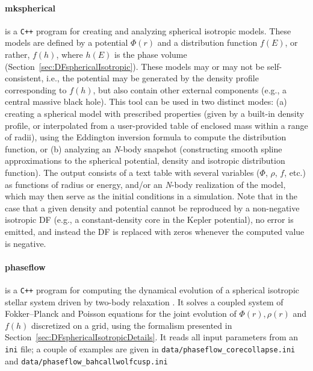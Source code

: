 \documentclass[12pt]{article}
\newcommand{\Nbody}{\textsl{N}-body\xspace}
\newcommand{\Cpp}  {\texttt{C++}\xspace}
\begin{document}
\paragraph{mkspherical} is a \Cpp program for creating and analyzing spherical isotropic models. These models are defined by a potential $\Phi(r)$ and a distribution function $f(E)$, or rather, $f(h)$, where $h(E)$ is the phase volume (Section~\ref{sec:DFsphericalIsotropic}). These models may or may not be self-consistent, i.e., the potential may be generated by the density profile corresponding to $f(h)$, but also contain other external components (e.g., a central massive black hole). This tool can be used in two distinct modes: (a) creating a spherical model with prescribed properties (given by a built-in density profile, or interpolated from a user-provided table of enclosed mass within a range of radii), using the Eddington inversion formula to compute the distribution function, or (b) analyzing an \Nbody snapshot (constructing smooth spline approximations to the spherical potential, density and isotropic distribution function). The output consists of a text table with several variables ($\Phi$, $\rho$, $f$, etc.) as functions of radius or energy, and/or an \Nbody realization of the model, which may then serve as the initial conditions in a simulation. Note that in the case that a given density and potential cannot be reproduced by a non-negative isotropic DF (e.g., a constant-density core in the Kepler potential), no error is emitted, and instead the DF is replaced with zeros whenever the computed value is negative.

\paragraph{phaseflow} is a \Cpp program for computing the dynamical evolution of a spherical isotropic stellar system driven by two-body relaxation \cite{Vasiliev2017}. It solves a coupled system of Fokker--Planck and Poisson equations for the joint evolution of $\Phi(r), \rho(r)$ and $f(h)$ discretized on a grid, using the formalism presented in Section~\ref{sec:DFsphericalIsotropicDetails}. It reads all input parameters from an \texttt{ini} file; a couple of examples are given in \texttt{data/phaseflow_corecollapse.ini} and \texttt{data/phaseflow_bahcallwolfcusp.ini}

\label{sec:raga}%
\end{document}
